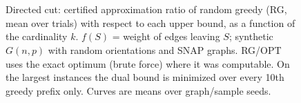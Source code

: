 \begin{figure}[t]
\centering
\setlength{\rgplotwidth}{0.49\columnwidth}
\\[1pt]
\hfill
\\
\hfill

\caption{Directed cut: certified approximation ratio of random greedy (RG, mean over trials) with respect to each upper bound, as a function of the cardinality $k$. $f(S)$ = weight of edges leaving $S$; synthetic $G(n,p)$ with random orientations and SNAP graphs. RG/OPT uses the exact optimum (brute force) where it was computable. On the largest instances the dual bound is minimized over every 10th greedy prefix only. Curves are means over graph/sample seeds.}
\label{fig:rg-directed_cut}
\end{figure}
